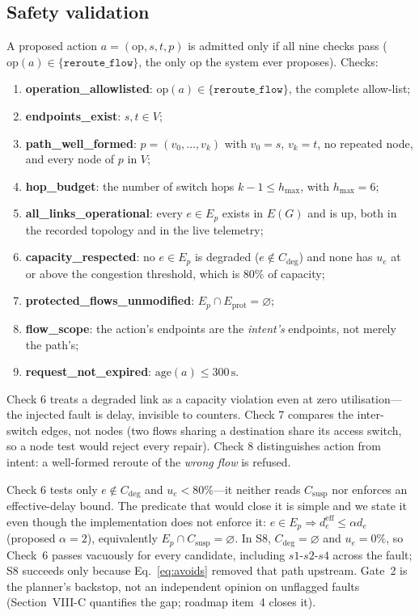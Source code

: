 \documentclass[conference]{IEEEtran}
\begin{document}
\subsection{Safety validation}

A proposed action $a=(\mathrm{op}, s, t, p)$ is admitted only if all nine
checks pass ($\mathrm{op}(a)\in\{\texttt{reroute\_flow}\}$, the only op
the system ever proposes). Checks:

\begin{enumerate}
\item \textbf{operation\_allowlisted}: $\mathrm{op}(a)\in
      \{\texttt{reroute\_flow}\}$, the complete allow-list;
\item \textbf{endpoints\_exist}: $s,t\in V$;
\item \textbf{path\_well\_formed}: $p=(v_0,\dots,v_k)$ with $v_0=s$,
      $v_k=t$, no repeated node, and every node of $p$ in $V$;
\item \textbf{hop\_budget}: the number of switch hops $k-1\le h_{\max}$,
      with $h_{\max}=6$;
\item \textbf{all\_links\_operational}: every $e\in E_p$ exists in
      $E(G)$ and is up, both in the recorded topology and in the live
      telemetry;
\item \textbf{capacity\_respected}: no $e\in E_p$ is degraded
      ($e\notin C_{\mathrm{deg}}$) and none has $u_e$ at
      or above the congestion threshold, which is $80\%$ of capacity;
\item \textbf{protected\_flows\_unmodified}: $E_p\cap
      E_{\mathrm{prot}}=\varnothing$;
\item \textbf{flow\_scope}: the action's endpoints are the \emph{intent's}
      endpoints, not merely the path's;
\item \textbf{request\_not\_expired}: $\mathrm{age}(a)\le 300\,\mathrm{s}$.
\end{enumerate}

Check 6 treats a degraded link as a capacity violation even at zero
utilisation---the injected fault is delay, invisible to counters. Check 7
compares the inter-switch edges, not nodes (two flows sharing a destination
share its access switch, so a node test would reject every repair). Check 8
distinguishes action from intent: a well-formed reroute of the \emph{wrong
flow} is refused.

Check 6 tests only $e\notin C_{\mathrm{deg}}$ and $u_e<80\%$---it neither
reads $C_{\mathrm{susp}}$ nor enforces an effective-delay bound. The
predicate that would close it is simple and we state it even though the
implementation does not enforce it: $e\in E_p\Rightarrow
d^{\mathrm{eff}}_e\le\alpha d_e$ (proposed $\alpha=2$), equivalently
$E_p\cap C_{\mathrm{susp}}=\varnothing$. In S8, $C_{\mathrm{deg}}=
\varnothing$ and $u_e=0\%$, so Check~6 passes vacuously for every
candidate, including $s1$-$s2$-$s4$ across the fault; S8 succeeds only
because Eq.~\eqref{eq:avoids} removed that path upstream. Gate~2 is the
planner's backstop, not an independent opinion on unflagged faults
(Section~VIII-C quantifies the gap; roadmap item~4 closes it).
\end{document}
